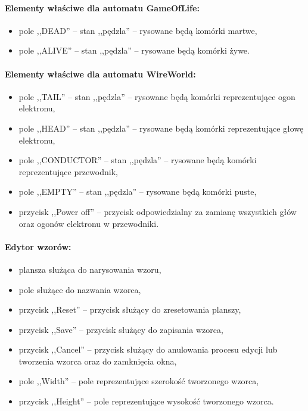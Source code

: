 \documentclass{mwart}
\begin{document}
\paragraph{Elementy właściwe dla automatu GameOfLife:}
\begin{itemize}
	\item pole ,,DEAD'' -- stan ,,pędzla'' -- rysowane będą komórki martwe,
	\item pole ,,ALIVE'' -- stan ,,pędzla'' -- rysowane będą komórki żywe.
\end{itemize}

\paragraph{Elementy właściwe dla automatu WireWorld:}
\begin{itemize}
	\item pole ,,TAIL'' -- stan ,,pędzla'' -- rysowane będą komórki reprezentujące ogon elektronu,
	\item pole ,,HEAD'' -- stan ,,pędzla'' -- rysowane będą komórki reprezentujące głowę elektronu,
	\item pole ,,CONDUCTOR'' -- stan ,,pędzla'' -- rysowane będą komórki reprezentujące przewodnik,
	\item pole ,,EMPTY'' -- stan ,,pędzla'' -- rysowane będą komórki puste,
	\item przycisk ,,Power off'' -- przycisk odpowiedzialny za zamianę wszystkich głów oraz ogonów elektronu w przewodniki.
\end{itemize}

\paragraph{Edytor wzorów:}
\begin{itemize}
	\item plansza służąca do narysowania wzoru,
	\item pole służące do nazwania wzorca,
	\item przycisk ,,Reset'' -- przycisk służący do zresetowania planszy,
	\item przycisk ,,Save'' -- przycisk służący do zapisania wzorca,
	\item przycisk ,,Cancel'' -- przycisk służący do anulowania procesu edycji lub tworzenia wzorca oraz do zamknięcia okna,
	\item pole ,,Width'' -- pole reprezentujące szerokość tworzonego wzorca,
	\item przycisk ,,Height'' -- pole reprezentujące wysokość tworzonego wzorca.
\end{itemize}
\end{document}
